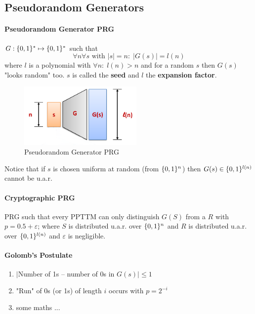 \subsection{Pseudorandom Generators}

\paragraph{Pseudorandom Generator PRG} $G: \lbrace 0, 1 \rbrace^* \mapsto \lbrace 0, 1 \rbrace^* $ such that
$$\forall n \forall s \text{ with } |s|=n : \; |G(s)| = l(n)$$
where $l$ is a polynomial with $\forall n: \; l(n) > n$ and for a random $s$ then $G(s)$ "looks random" too. $s$ is called the \textbf{seed} and $l$ the \textbf{expansion factor}.

\begin{figure}[h]
    \centering
    \includegraphics[width=6cm]{images/ch3-sc-prg.png}
    \caption{Pseudorandom Generator PRG}
    \label{fig:sc-prg}
\end{figure}

Notice that if $s$ is chosen uniform at random (from $\lbrace 0, 1 \rbrace^n$) then $G(s) \in \lbrace 0, 1 \rbrace^{l(n)}$ cannot be u.a.r.

\paragraph{Cryptographic PRG} PRG such that every PPTTM can only distinguish $G(S)$ from a $R$ with $p=0.5 + \varepsilon$; where $S$ is distributed u.a.r. over $\lbrace 0, 1 \rbrace^n$ and $R$ is distributed u.a.r. over $\lbrace 0, 1 \rbrace^{l(n)}$ and $\varepsilon$ is negligible.

\paragraph{Golomb's Postulate}
\begin{enumerate}
    \item $|$Number of 1s -- number of 0s in $G(s)| \leq 1$
    \item "Run" of 0s (or 1s) of length $i$ occurs with $p=2^{-i}$
    \item some maths ...
\end{enumerate}

